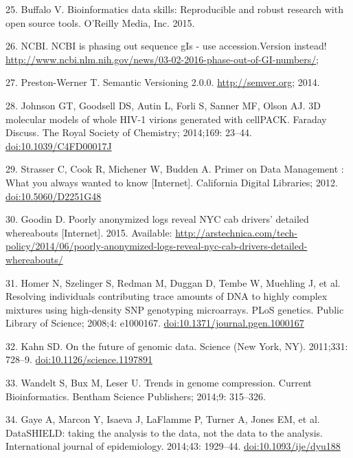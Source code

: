 \documentclass[10pt,letterpaper]{article}
\begin{document}
25. Buffalo V. Bioinformatics data skills: Reproducible and robust
research with open source tools. O'Reilly Media, Inc. 2015.

26. NCBI. NCBI is phasing out sequence gIs - use accession.Version
instead!
\url{http://www.ncbi.nlm.nih.gov/news/03-02-2016-phase-out-of-GI-numbers/};

27. Preston-Werner T. Semantic Versioning 2.0.0.
\url{http://semver.org}; 2014.

28. Johnson GT, Goodsell DS, Autin L, Forli S, Sanner MF, Olson AJ. 3D
molecular models of whole HIV-1 virions generated with cellPACK. Faraday
Discuss. The Royal Society of Chemistry; 2014;169: 23--44.
\href{http://doi.org/10.1039/C4FD00017J}{doi:10.1039/C4FD00017J}

29. Strasser C, Cook R, Michener W, Budden A. Primer on Data Management
: What you always wanted to know {[}Internet{]}. California Digital
Libraries; 2012.
\href{http://doi.org/10.5060/D2251G48}{doi:10.5060/D2251G48}

30. Goodin D. Poorly anonymized logs reveal NYC cab drivers' detailed
whereabouts {[}Internet{]}. 2015. Available:
\url{http://arstechnica.com/tech-policy/2014/06/poorly-anonymized-logs-reveal-nyc-cab-drivers-detailed-whereabouts/}

31. Homer N, Szelinger S, Redman M, Duggan D, Tembe W, Muehling J, et
al. Resolving individuals contributing trace amounts of DNA to highly
complex mixtures using high-density SNP genotyping microarrays. PLoS
genetics. Public Library of Science; 2008;4: e1000167.
\href{http://doi.org/10.1371/journal.pgen.1000167}{doi:10.1371/journal.pgen.1000167}

32. Kahn SD. On the future of genomic data. Science (New York, NY).
2011;331: 728--9.
\href{http://doi.org/10.1126/science.1197891}{doi:10.1126/science.1197891}

33. Wandelt S, Bux M, Leser U. Trends in genome compression. Current
Bioinformatics. Bentham Science Publishers; 2014;9: 315--326.

34. Gaye A, Marcon Y, Isaeva J, LaFlamme P, Turner A, Jones EM, et al.
DataSHIELD: taking the analysis to the data, not the data to the
analysis. International journal of epidemiology. 2014;43: 1929--44.
\href{http://doi.org/10.1093/ije/dyu188}{doi:10.1093/ije/dyu188}
\end{document}
